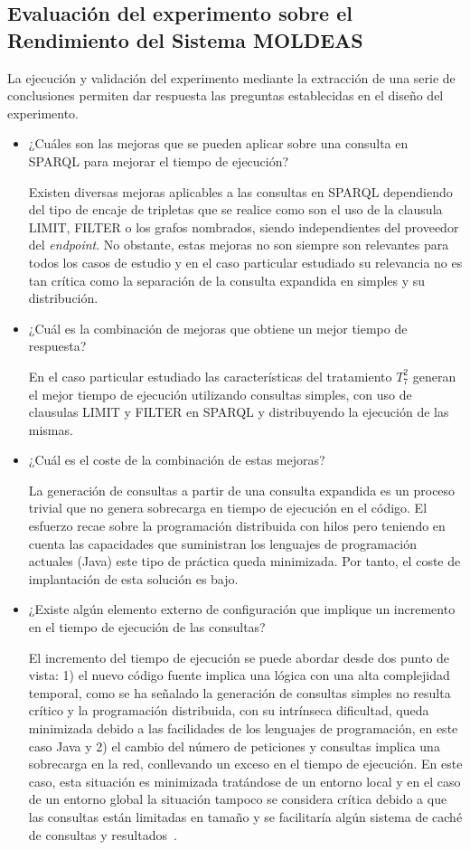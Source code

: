 \subsection{Evaluación del experimento sobre el Rendimiento del Sistema MOLDEAS}
La ejecución y validación del experimento mediante la extracción de una serie de conclusiones permiten 
dar respuesta las preguntas establecidas en el diseño del experimento.
\begin{itemize}
  \item ¿Cuáles son las mejoras que se pueden aplicar sobre una consulta en \gls{SPARQL} para mejorar el tiempo de ejecución? 

Existen diversas mejoras aplicables a las consultas en SPARQL dependiendo del tipo de encaje de tripletas que se realice como son el 
uso de la clausula LIMIT, FILTER o los grafos nombrados, siendo independientes del proveedor del \textit{endpoint}. No obstante, estas mejoras no son siempre son relevantes para todos los 
casos de estudio y en el caso particular estudiado su relevancia no es tan crítica como la separación de la consulta expandida 
en simples y su distribución.
 \item ¿Cuál es la combinación de mejoras que obtiene un mejor tiempo de respuesta? 

En el caso particular estudiado las características 
del tratamiento $T^{2}_7$ generan el mejor tiempo de ejecución utilizando consultas simples, con uso de clausulas LIMIT y FILTER en SPARQL 
y distribuyendo la ejecución de las mismas.
 \item ¿Cuál es el coste de la combinación de estas mejoras? 

La generación de consultas a partir de una consulta expandida es un proceso 
trivial que no genera sobrecarga en tiempo de ejecución en el código. El esfuerzo recae sobre la programación distribuida con hilos pero 
teniendo en cuenta las capacidades que suministran los lenguajes de programación actuales (Java) este tipo de práctica queda minimizada. Por tanto, 
el coste de implantación de esta solución es bajo.
 \item ¿Existe algún elemento externo de configuración que implique un incremento en el tiempo de ejecución de las consultas? 

El incremento del tiempo de ejecución se puede abordar desde dos punto de vista: 1) el nuevo código fuente implica una lógica con una alta 
complejidad temporal, como se ha señalado la generación de consultas simples no resulta crítico y la programación distribuida, con su intrínseca 
dificultad, queda minimizada debido a las facilidades de los lenguajes de programación, en este caso Java y 2) el cambio del número de peticiones 
y consultas implica una sobrecarga en la red, conllevando un exceso en el tiempo de ejecución. En este caso, esta situación es minimizada 
tratándose de un entorno local y en el caso de un entorno global la situación tampoco se considera crítica debido a que las consultas 
están limitadas en tamaño y se facilitaría algún sistema de caché de consultas y resultados~\cite{Blanco:2010:CSE:1835449.1835466}.



\end{itemize}
